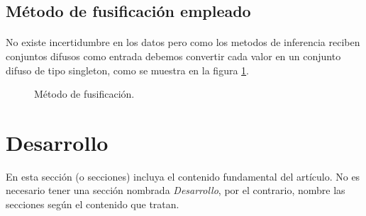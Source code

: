 \documentclass[a4paper,10pt,twocolumn]{article}
\begin{document}
\subsection{Método de fusificación empleado}\label{sub:fuzzification}
\paragraph{} No existe incertidumbre en los datos pero como los metodos de inferencia reciben conjuntos difusos como entrada debemos convertir cada valor
en un conjunto difuso de tipo singleton, como se muestra en la figura \ref{fig:fuzzification}.

\begin{figure}[htb]%
	\begin{center}
	\end{center}
	\caption{Método de fusificación.\label{fig:fuzzification}}%
\end{figure}

 




\section{Desarrollo}\label{sec:dev}
  En esta sección (o secciones) incluya el contenido fundamental del artículo.
  No es necesario tener una sección nombrada \emph{Desarrollo}, por el contrario,
  nombre las secciones según el contenido que tratan.
\end{document}
